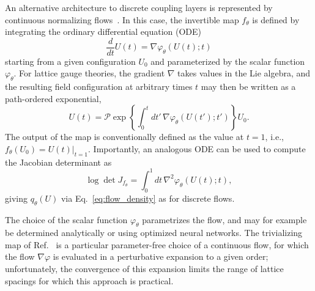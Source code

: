 \documentclass[12pt]{article}
\begin{document}
An alternative architecture to discrete coupling layers is represented by continuous normalizing flows~\cite{Chen:2018wjc,zhang2018monge,zhang2021diffusion}. In this case, the invertible map $f_\theta$ is defined by integrating the ordinary differential equation (ODE)
\begin{equation}
\frac{d}{dt} U(t) = \nabla \varphi_\theta(U(t); t)
\end{equation}
starting from a given configuration $U_0$ and parameterized by the scalar function $\varphi_\theta$. For lattice gauge theories, the gradient $\nabla$ takes values in the Lie algebra, and the resulting field configuration at arbitrary times $t$ may then be written as a path-ordered exponential,
\begin{equation}
U(t) = \mathcal{P}\exp \left\{ \int_0^t dt' \, \nabla \varphi_\theta(U(t'); t') \right\} U_0.
\end{equation}
The output of the map is conventionally defined as the value at $t=1$, i.e., $f_\theta(U_0) = U(t)|_{t=1}$.
Importantly, an analogous ODE can be used to compute the Jacobian determinant as
\begin{equation}
    \log \det J_{f_\theta} = \int_0^1 dt \, \nabla^2 \varphi_\theta(U(t); t),
\end{equation}
giving $q_\theta(U)$ via Eq.~\eqref{eq:flow_density} as for discrete flows.

The choice of the scalar function $\varphi_{\theta}$ parametrizes the flow, and may for example be determined analytically or using optimized neural networks.
The trivializing map of Ref.~\cite{Luscher:2009eq} is a particular parameter-free choice of a continuous flow, for which the flow $\nabla \varphi$ is evaluated in a perturbative expansion to a given order; unfortunately, the convergence of this expansion limits the range of lattice spacings for which this approach is practical.
\end{document}
